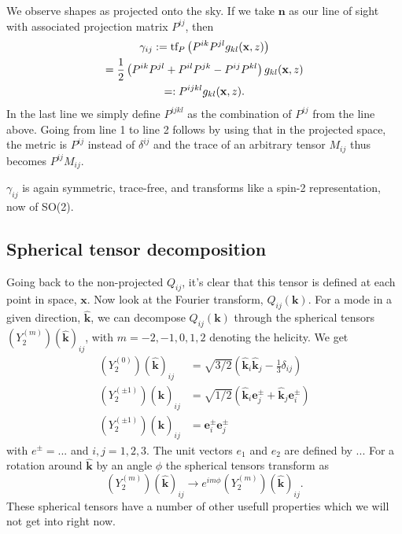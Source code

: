 \documentclass[11pt]{article}
\DeclareRobustCommand{\tf}{\ifmmode\text{tf}\else d\fi}
\newcommand{\br}[1]{\ensuremath{\left( #1 \right)}}
\begin{document}
We observe shapes as projected onto the sky. If we take $\mathbf n$ as our line of sight with associated projection matrix $P^{ij}$, then
\begin{gather}
    \gamma_{ij} := \tf_P\br{P^{ik}P^{jl}g_{kl}(\mathbf x, z)}\\
                = \frac{1}{2}\br{P^{ik}P^{jl} + P^{il}P^{jk} - P^{ij}P^{kl}}g_{kl}(\mathbf x, z)\\
                =: P^{ijkl}g_{kl}(\mathbf x, z).
\end{gather}
In the last line we simply define $P^{ijkl}$ as the combination of $P^{ij}$ from the line above. Going from line 1 to line 2 follows by using that in the projected space, the metric is $P^{ij}$ instead of $\delta^{ij}$ and the trace of an arbitrary tensor $M_{ij}$ thus becomes $P^{ij}M_{ij}$. %

$\gamma_{ij}$ is again symmetric, trace-free, and transforms like a spin-2 representation, now of SO(2).

\subsection{Spherical tensor decomposition}
Going back to the non-projected $Q_{ij}$, it's clear that this tensor is defined at each point in space, $\mathbf x$. Now look at the Fourier transform, $Q_{ij}(\mathbf k)$. For a mode in a given direction, $\hat{\mathbf k}$, we can decompose $Q_{ij}(\mathbf k)$ through the spherical tensors $(Y_2^{(m)})(\hat{\mathbf k})_{ij}$, with $m=-2, -1, 0, 1, 2$ denoting the helicity. %
We get
\begin{align}
    (Y_2^{(0)})(\hat{\mathbf k})_{ij} &= \sqrt{3/2}(\hat{\mathbf k}_i\hat{\mathbf k}_j - \frac{1}{3}\delta_{ij})\\
    (Y_2^{(\pm 1)})(\hat{\mathbf k})_{ij} &= \sqrt{1/2}(\hat{\mathbf k}_i\mathbf e_j^\pm + \hat{\mathbf k}_j\mathbf e_i^\pm)\\
    (Y_2^{(\pm 1)})(\hat{\mathbf k})_{ij} &= \mathbf e_i^\pm \mathbf e_j^\pm
\end{align}
with $e^{\pm}=...$%
and $i,j=1,2,3$. The unit vectors $e_1$ and $e_2$ are defined by $...$ %
For a rotation around $\hat{\mathbf k}$ by an angle $\phi$ the spherical tensors transform as
$$
(Y_2^{(m)})(\hat{\mathbf k})_{ij} \rightarrow e^{im\phi}(Y_2^{(m)})(\hat{\mathbf k})_{ij}.
$$
These spherical tensors have a number of other usefull properties which we will not get into right now. 
\end{document}
